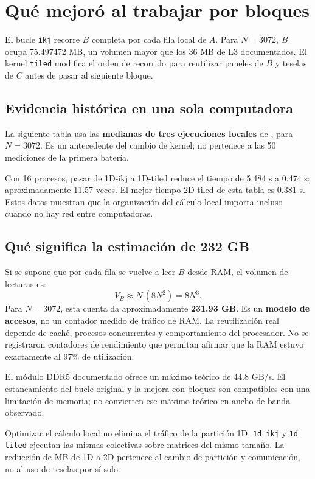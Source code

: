 \clearpage
\section{Qué mejoró al trabajar por bloques}

El bucle \texttt{ikj} recorre $B$ completa por cada fila local de $A$. Para $N=3072$, $B$ ocupa 75.497472 MB, un volumen mayor que los 36 MB de L3 documentados. El kernel \texttt{tiled} modifica el orden de recorrido para reutilizar paneles de $B$ y teselas de $C$ antes de pasar al siguiente bloque.

\subsection{Evidencia histórica en una sola computadora}
La siguiente tabla usa las \textbf{medianas de tres ejecuciones locales} de , para $N=3072$. Es un antecedente del cambio de kernel; no pertenece a las 50 mediciones de la primera batería.


Con 16 procesos, pasar de 1D-ikj a 1D-tiled reduce el tiempo de 5.484 s a 0.474 s: aproximadamente 11.57 veces. El mejor tiempo 2D-tiled de esta tabla es 0.381 s. Estos datos muestran que la organización del cálculo local importa incluso cuando no hay red entre computadoras.

\subsection{Qué significa la estimación de 232 GB}
Si se supone que por cada fila se vuelve a leer $B$ desde RAM, el volumen de lecturas es:
\[
 V_B\approx N\,(8N^2)=8N^3.
\]
Para $N=3072$, esta cuenta da aproximadamente \textbf{231.93 GB}. Es un \textbf{modelo de accesos}, no un contador medido de tráfico de RAM. La reutilización real depende de caché, procesos concurrentes y comportamiento del procesador. No se registraron contadores de rendimiento que permitan afirmar que la RAM estuvo exactamente al 97\% de utilización.

El módulo DDR5 documentado ofrece un máximo teórico de 44.8 GB/s. El estancamiento del bucle original y la mejora con bloques son compatibles con una limitación de memoria; no convierten ese máximo teórico en ancho de banda observado.

\begin{idea}
Optimizar el cálculo local no elimina el tráfico de la partición 1D. \texttt{1d ikj} y \texttt{1d tiled} ejecutan las mismas colectivas sobre matrices del mismo tamaño. La reducción de MB de 1D a 2D pertenece al cambio de partición y comunicación, no al uso de teselas por sí solo.
\end{idea}

